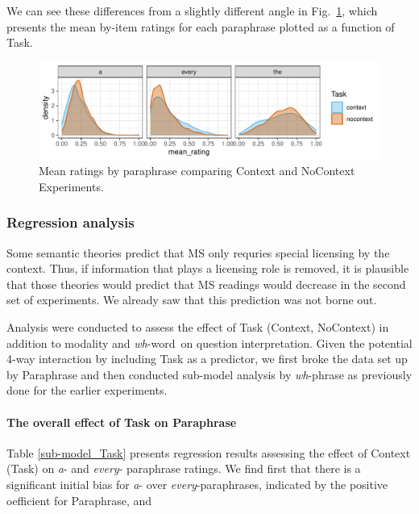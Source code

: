 \documentclass[12pt,letterpaper,table,svgnames,dvipsnames]{article}
\newcommand{\figref}[1]{Fig.~\ref{#1}}
\newcommand{\whw}{\emph{wh}-word~}
\begin{document}
We can see these differences from a slightly different angle in \figref{density_Task_overall}, which presents the mean by-item ratings for each paraphrase plotted as a function of Task. 
\begin{figure}[h!]
\centering
\centering
\includegraphics[scale=1]{figures/denisty_context_ratings.pdf}
\caption{Mean ratings by paraphrase comparing Context and NoContext Experiments.}
\label{density_Task_overall}
\end{figure}


\subsubsection{Regression analysis}
Some semantic theories predict that MS only requries special licensing by the context. Thus, if information that plays a licensing role is removed, it is plausible that those theories would predict that MS readings would decrease in the second set of experiments. We already saw that this prediction was not borne out. 

Analysis were conducted to assess the effect of Task (Context, NoContext) in addition to modality and \whw on question interpretation. Given the potential 4-way interaction by including Task as a predictor, we first broke the data set up by Paraphrase and then conducted sub-model analysis by \emph{wh}-phrase as previously done for the earlier experiments.


\paragraph{The overall effect of Task on Paraphrase}

Table \ref{sub-model_Task} presents regression results assessing the effect of Context (Task) on \emph{a}- and \emph{every}- paraphrase ratings. We find first that there is a significant initial bias for \emph{a}- over \emph{every}-paraphrases, indicated by the positive oefficient for Paraphrase, and 
\end{document}
